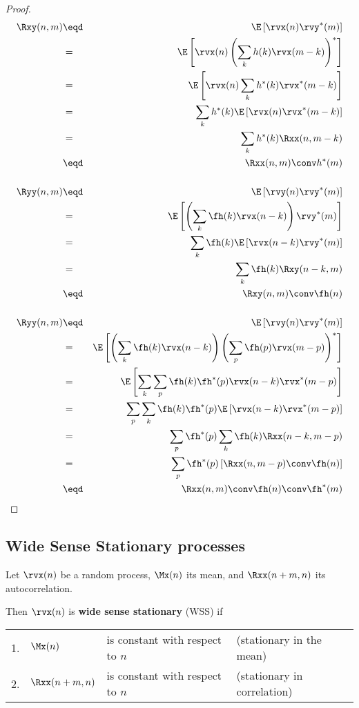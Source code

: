 \begin{proof}
\begin{eqnarray*}
   \Rxy(n,m)
     &\eqd& \E\left[\rvx(n) \rvy^\ast(m) \right]
   \\&=&    \E\left[\rvx(n) \left( \sum_k h(k) \rvx(m-k)    \right)^\ast \right]
   \\&=&    \E\left[\rvx(n) \sum_k h^\ast(k) \rvx^\ast(m-k)     \right]
   \\&=&    \sum_k h^\ast(k) \E\left[\rvx(n) \rvx^\ast(m-k) \right]
   \\&=&    \sum_k h^\ast(k) \Rxx(n,m-k)
   \\&\eqd& \Rxx(n,m) \conv h^\ast(m)
\\
\\
   \Ryy(n,m)
     &\eqd& \E\left[\rvy(n) \rvy^\ast(m)  \right]
   \\&=&    \E\left[\left(\sum_k \fh(k) \rvx(n-k)\right) \rvy^\ast(m)  \right]
   \\&=&    \sum_k \fh(k) \E\left[\rvx(n-k)\rvy^\ast(m)\right]
   \\&=&    \sum_k \fh(k) \Rxy(n-k,m)
   \\&\eqd&  \Rxy(n,m)\conv \fh(n)
\\
\\
   \Ryy(n,m)
     &\eqd& \E\left[\rvy(n) \rvy^\ast(m)  \right]
   \\&=&    \E\left[\left(\sum_k \fh(k) \rvx(n-k)\right)
                    \left(\sum_p \fh(p) \rvx(m-p)\right)^\ast
              \right]
   \\&=&    \E\left[\sum_k\sum_p \fh(k)\fh^\ast(p) \rvx(n-k)\rvx^\ast(m-p)
              \right]
   \\&=&    \sum_p\sum_k \fh(k)\fh^\ast(p)
            \E\left[\rvx(n-k)\rvx^\ast(m-p)\right]
   \\&=&    \sum_p\fh^\ast(p) \sum_k \fh(k) \Rxx(n-k,m-p)
   \\&=&    \sum_p\fh^\ast(p) \left[\Rxx(n,m-p)\conv\fh(n)\right]
   \\&\eqd& \Rxx(n,m)\conv\fh(n) \conv \fh^\ast(m)
\end{eqnarray*}
\end{proof}


\subsection{Wide Sense Stationary processes}
\begin{definition}
Let
   $\rvx(n)$ be a random process,
   $\Mx(n)$ its mean, and
   $\Rxx(n+m,n)$ its autocorrelation.

Then $\rvx(n)$ is \textbf{wide sense stationary} (WSS) if

\begin{tabular}{llll}
   1. & $\Mx(n)$         & is constant with respect to $n$ & (stationary in the mean) \\
   2. & $\Rxx(n+m,n)$ & is constant with respect to $n$ & (stationary in correlation)
\end{tabular}
\end{definition}

